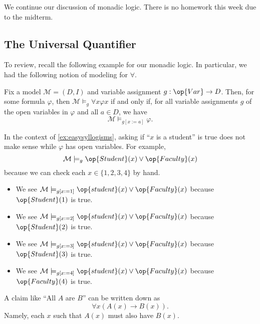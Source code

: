 \documentclass[../notes.tex]{subfiles}
\begin{document}

We continue our discussion of monadic logic. There is no homework this week due to the midterm.

\subsection{The Universal Quantifier}
To review, recall the following example for our monadic logic.
\easymonad*
In particular, we had the following notion of modeling for $\forall$.
\begin{definition}
	Fix a model $\mathcal M=(D,I)$ and variable assignment $g:\op{Var}\to D$. Then, for some formula $\varphi$, then $\mathcal M\models_g\forall x\varphi x$ if and only if, for all variable assignments $g$ of the open variables in $\varphi$ and all $a\in D$, we have
	\[\mathcal M\models_{g[x:=a]}\varphi.\]
\end{definition}
\begin{example}
	In the context of \autoref{ex:easysyllogisms}, asking if ``$x$ is a student'' is true does not make sense while $\varphi$ has open variables. For example,
	\[\mathcal M\models_g\op{Student}(x)\lor\op{Faculty}(x)\]
	because we can check each $x\in\{1,2,3,4\}$ by hand.
	\begin{itemize}
		\item We see $\mathcal M\models_{g[x:=1]}\op{student}(x)\lor\op{Faculty}(x)$ because $\op{Student}(1)$ is true.
		\item We see $\mathcal M\models_{g[x:=2]}\op{student}(x)\lor\op{Faculty}(x)$ because $\op{Student}(2)$ is true.
		\item We see $\mathcal M\models_{g[x:=3]}\op{student}(x)\lor\op{Faculty}(x)$ because $\op{Student}(3)$ is true.
		\item We see $\mathcal M\models_{g[x:=4]}\op{student}(x)\lor\op{Faculty}(x)$ because $\op{Faculty}(4)$ is true.
	\end{itemize}
\end{example}
\begin{remark}
	A claim like ``All $A$ are $B$'' can be written down as
	\[\forall x(A(x)\to B(x)).\]
	Namely, each $x$ such that $A(x)$ must also have $B(x)$.
\end{remark}
\end{document}
